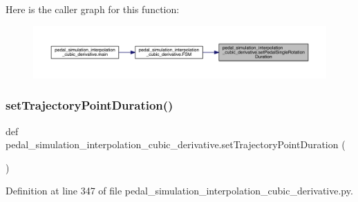 Here is the caller graph for this function\+:\nopagebreak
\begin{figure}[H]
\begin{center}
\leavevmode
\includegraphics[width=350pt]{namespacepedal__simulation__interpolation__cubic__derivative_a4f6620c14991a28592c3f3dbed06d47d_icgraph}
\end{center}
\end{figure}
\mbox{\label{namespacepedal__simulation__interpolation__cubic__derivative_ac9f7dfe56632b8e7d44453f45ce5ed12}} 
\subsubsection{\texorpdfstring{setTrajectoryPointDuration()}{setTrajectoryPointDuration()}}
{\footnotesize\ttfamily def pedal\+\_\+simulation\+\_\+interpolation\+\_\+cubic\+\_\+derivative.\+set\+Trajectory\+Point\+Duration (\begin{DoxyParamCaption}{ }\end{DoxyParamCaption})}



Definition at line 347 of file pedal\+\_\+simulation\+\_\+interpolation\+\_\+cubic\+\_\+derivative.\+py.


